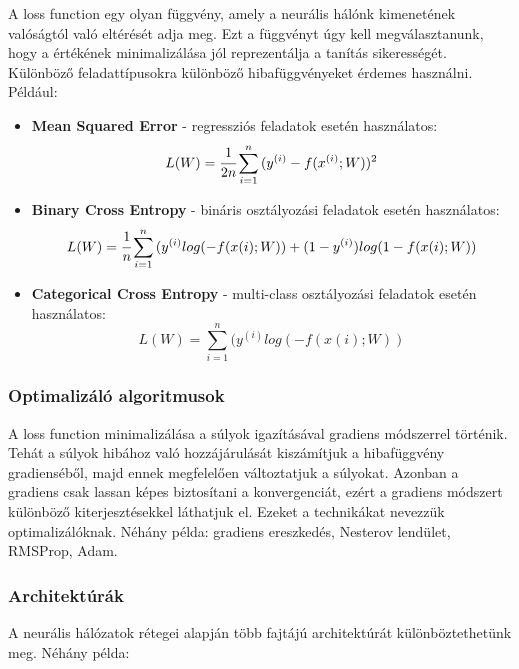 A loss function egy olyan függvény, amely a neurális hálónk kimenetének valóságtól való eltérését adja meg. Ezt a függvényt úgy kell megválasztanunk, hogy a értékének minimalizálása jól reprezentálja a tanítás sikerességét. Különböző feladattípusokra különböző hibafüggvényeket érdemes használni. Például:
\begin{itemize}
 \item \textbf{Mean Squared Error} - regressziós feladatok esetén használatos:
\begin{equation}
	L(W) = \cfrac{1}{2n}\sum_{i=1}^{n}{(y^{(i)}-f(x^{(i)};W))^2}
\end{equation}
 \item \textbf{Binary Cross Entropy} - bináris osztályozási feladatok esetén használatos:
\begin{equation}
	L(W) = \cfrac{1}{n}\sum_{i=1}^{n}{(y^{(i)}log(-f(x{(i)};W))+(1-y^{(i)})log(1-f(x{(i)};W))}
\end{equation}
 \item \textbf{Categorical Cross Entropy} - multi-class osztályozási feladatok esetén használatos: \cite{deeplearningbook}
\begin{equation}
	L(W) = \sum_{i=1}^{n}{(y^{(i)}log(-f(x{(i)};W))}
\end{equation}
 \end{itemize}

\subsubsection{Optimalizáló algoritmusok}

A loss function minimalizálása a súlyok igazításával gradiens módszerrel történik. Tehát a súlyok hibához való hozzájárulását kiszámítjuk a hibafüggvény gradienséből, majd ennek megfelelően változtatjuk a súlyokat. Azonban a gradiens csak lassan képes biztosítani a konvergenciát, ezért a gradiens módszert különböző kiterjesztésekkel láthatjuk el. Ezeket a technikákat nevezzük optimalizálóknak. Néhány példa: gradiens ereszkedés, Nesterov lendület, RMSProp, Adam. \cite{deeplearningbook}

\subsubsection{Architektúrák}

A neurális hálózatok rétegei alapján több fajtájú architektúrát különböztethetünk meg. Néhány példa:

